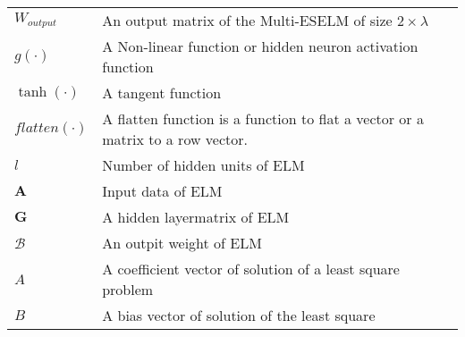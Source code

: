 \begin{flushleft}
\begin{tabular}{ll}
$W_{output}$ & An output matrix of the Multi-ESELM of size $2 \times\lambda$\\

$g(\cdot)$ & A Non-linear function or hidden neuron activation function\\

$\tanh(\cdot)$ & A tangent function\\

$flatten(\cdot)$ & A flatten function is a function to flat a vector or a matrix to a row vector.\\

$l$ & Number of hidden units of ELM\\

$\mathbf{A}$ & Input data of ELM\\ 

$\mathbf{G}$ & A hidden layermatrix of ELM\\

$\mathcal{B}$ & An outpit weight of ELM\\

$A$ & A coefficient vector of solution of a least square problem\\

$B$ & A bias vector of solution of the least square \\

\end{tabular}
\end{flushleft}